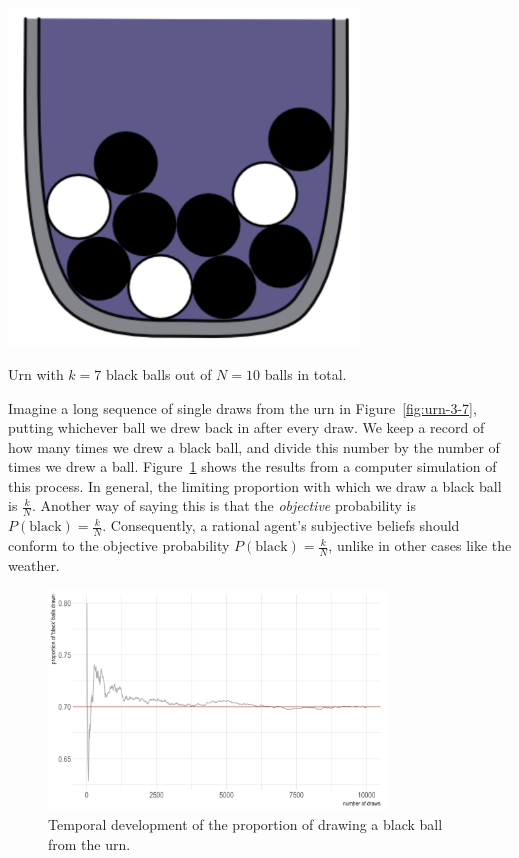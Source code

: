 \documentclass[nobib,nofonts]{tufte-handout}
\begin{document}
\begin{marginfigure}
  \centering
  \includegraphics[width=0.7\textwidth]{00-pics/05-01-urn-3-7.png}
  \caption{Urn with $k=7$ black balls out of $N=10$ balls in total.}
  \label{fig:urn-3-7}
\end{marginfigure}

Imagine a long sequence of single draws from the urn in Figure~\ref{fig:urn-3-7}, putting whichever ball we drew back in after every draw.
We keep a record of how many times we drew a black ball, and divide this number by the number of times we drew a ball.
Figure~\ref{fig:limiting-frequencies} shows the results from a computer simulation of this process.
In general, the limiting proportion with which we draw a black ball is $\frac{k}{N}$.
Another way of saying this is that the \emph{objective} probability is $P(\text{black}) = \frac{k}{N}$.
Consequently, a rational agent's subjective beliefs should conform to the objective probability $P(\text{black}) = \frac{k}{N}$, unlike in other cases like the weather.

\begin{figure}
  \centering
  \includegraphics[width=0.8\textwidth]{00-pics/05-02-limiting-frequencies.png}
  \caption{Temporal development of the proportion of drawing a black ball from the urn.}
  \label{fig:limiting-frequencies}
\end{figure}
\end{document}
